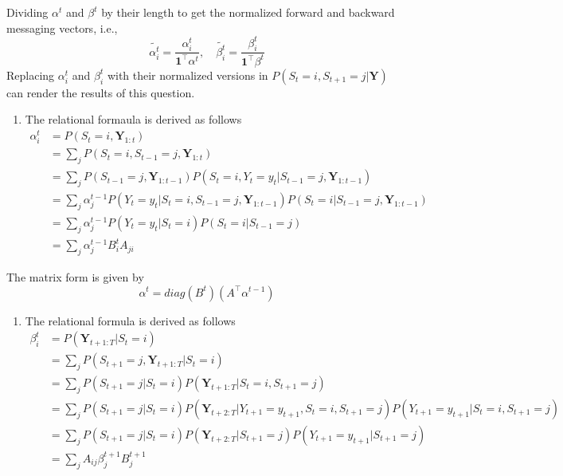 \documentclass[]{article}
\providecommand{\tightlist}{%
  \setlength{\itemsep}{0pt}\setlength{\parskip}{0pt}}
\begin{document}
Dividing \(\alpha^t\) and \(\beta^t\) by their length to get the
normalized forward and backward messaging vectors, i.e.,
\[\tilde{\alpha^t_i} = \frac{\alpha^t_i}{\mathbf{1}^\top\alpha^t}, \quad \tilde{\beta^t_i} = \frac{\beta^t_i}{\mathbf{1}^\top\beta^t}\]
Replacing \(\alpha^t_i\) and \(\beta^t_i\) with their normalized
versions in \(P(S_t = i, S_{t+1} = j | \mathbf{Y})\) can render the
results of this question.

\begin{enumerate}
\def\labelenumi{\arabic{enumi}.}
\setcounter{enumi}{4}
\tightlist
\item
  The relational formaula is derived as follows \[\begin{align}
  \alpha^t_i & = P(S_t=i,\mathbf{Y}_{1:t}) \\
  & = \sum_j P(S_t = i, S_{t-1} = j, \mathbf{Y}_{1:t}) \\
  & = \sum_j P(S_{t-1} = j, \mathbf{Y}_{1:t-1})P(S_t = i, Y_t = y_t | S_{t-1} = j, \mathbf{Y}_{1:t-1}) \\
  & = \sum_j \alpha^{t-1}_j P(Y_t = y_t | S_t = i, S_{t-1} = j, \mathbf{Y}_{1:t-1})P(S_t=i | S_{t-1} = j, \mathbf{Y}_{1:t-1}) \\
  & = \sum_j \alpha^{t-1}_j P(Y_t = y_t | S_t = i)P(S_t=i | S_{t-1} = j) \\
  & = \sum_j \alpha^{t-1}_j B^t_i A_{ji}
  \end{align}\]
\end{enumerate}

The matrix form is given by
\[\alpha^t = diag(B^t)\left(A^\top \alpha^{t-1}\right)\]

\begin{enumerate}
\def\labelenumi{\arabic{enumi}.}
\setcounter{enumi}{5}
\tightlist
\item
  The relational formula is derived as follows \[\begin{align}
  \beta^t_i & = P(\mathbf{Y}_{t+1:T}|S_t = i) \\
  & = \sum_j P(S_{t+1}=j,\mathbf{Y}_{t+1:T}|S_t = i) \\
  & = \sum_j P(S_{t+1}=j|S_t = i) P(\mathbf{Y}_{t+1:T} | S_t=i, S_{t+1} = j) \\
  & = \sum_j P(S_{t+1}=j|S_t = i) P(\mathbf{Y}_{t+2:T} | Y_{t+1} = y_{t+1}, S_t=i, S_{t+1} = j) P(Y_{t+1} = y_{t+1}| S_t=i, S_{t+1} = j) \\
  & = \sum_j P(S_{t+1}=j|S_t = i) P(\mathbf{Y}_{t+2:T} | S_{t+1} = j) P(Y_{t+1} = y_{t+1}| S_{t+1} = j) \\
  & = \sum_j A_{ij} \beta^{t+1}_j B^{t+1}_j
  \end{align}\]
\end{enumerate}
\end{document}
